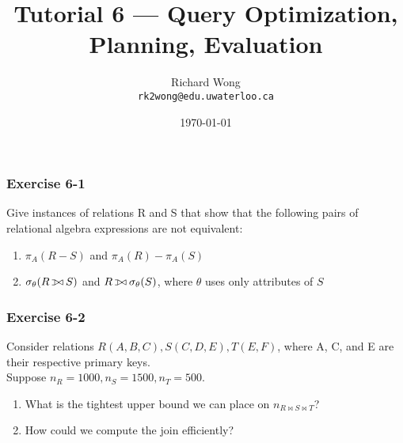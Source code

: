 

\def\ojoin{\setbox0=\hbox{$\bowtie$}%
  \rule[-.02ex]{.25em}{.4pt}\llap{\rule[\ht0]{.25em}{.4pt}}}
\def\leftouterjoin{\mathbin{\ojoin\mkern-5.8mu\bowtie}}

\title{Tutorial 6 --- Query Optimization, Planning, Evaluation }

\author{Richard Wong \\ \small \texttt{rk2wong@edu.uwaterloo.ca}}
\date{\today}




\begin{frame}
  \titlepage

\end{frame}


\begin{frame}
\frametitle{Exercise 6-1}

Give instances of relations R and S that show that the following pairs of relational algebra expressions are not equivalent:

\begin{enumerate}
  \item $\pi_A(R - S)$ and $\pi_A(R) - \pi_A(S)$
  \item $\sigma_{\theta}(R \leftouterjoin S)$ and $R \leftouterjoin \sigma_{\theta}(S)$, where $\theta$ uses only attributes of $S$
\end{enumerate}

\end{frame}


\begin{frame}
\frametitle{Exercise 6-2}

Consider relations $R(A, B, C), S(C, D, E), T(E, F)$, where A, C, and E are their respective primary keys. \\

Suppose $n_R = 1000, n_S = 1500, n_T = 500$.


\begin{enumerate}
  \item What is the tightest upper bound we can place on $n_{ R \bowtie S \bowtie T }$?
  \item How could we compute the join efficiently?
\end{enumerate}


\end{frame}


